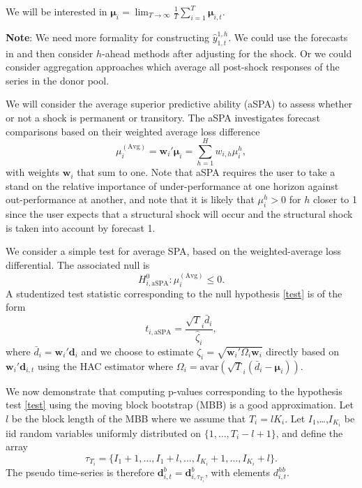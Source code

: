 \documentclass[11pt]{article}
\def\mbf#1{\mathbf{#1}} %
\theoremstyle{definition}
\begin{document}
We will be interested in $\mathbf{\mu}_i = \lim_{T\to\infty}\frac{1}{T}\sum_{i=1}^T \mathbf{\mu}_{i,t}$.

\vspace*{0.5cm}\noindent\textbf{Note}: We need more formality for constructing $\hat y^{1,h}_{1,t}$. We could use the forecasts in \cite{lin2021minimizing} and then consider $h$-ahead methods after adjusting for the shock. Or we could consider aggregation approaches which average all post-shock responses of the series in the donor pool. 
\vspace*{0.5cm}

We will consider the average superior predictive ability (aSPA) to assess whether or not a shock is permanent or transitory. The aSPA investigates forecast comparisons based on their weighted average loss difference
$$
  \mu^{(\text{Avg})}_i = \textbf{w}_i'\mathbf{\mu}_i = \sum_{h=1}^H w_{i,h} \mu_i^h,
$$
with weights $\textbf{w}_i$ that sum to one. Note that aSPA requires the user to take a stand on the relative importance of under-performance at one horizon against out-performance at another, and note that it is likely that $\mu_i^h > 0$ for $h$ closer to 1 since the user expects that a structural shock will occur and the structural shock is taken into account by forecast 1. 

We consider a simple test for average SPA, based on the weighted-average loss differential. The associated null is
\begin{equation} \label{test}
	H_{i,\text{aSPA}}^0: \mu^{(\text{Avg})}_i \leq 0.
\end{equation}
A studentized test statistic corresponding to the null hypothesis \eqref{test} is of the form 
\begin{equation} \label{tstat}
	t_{i,\text{aSPA}} = \frac{\sqrt{T}_i\bar{d}_{i}}{\hat{\zeta}_{i}},
\end{equation}
where $\bar{d}_{i} = \textbf{w}_i'\textbf{d}_{i}$ and we choose to estimate $\zeta_{i} = \sqrt{\textbf{w}_i'\Omega_{i}\textbf{w}_i}$ directly based on $\textbf{w}_i'\textbf{d}_{i,t}$ using the HAC estimator \citep{giacomini2006tests} where $\Omega_{i} = \text{avar}\left(\sqrt{T}_i(\bar{d}_{i} - \mbf{\mu}_{i})\right)$.


We now demonstrate that computing p-values corresponding to the hypothesis test \eqref{test} using the moving block bootstrap (MBB) is a good approximation. Let $l$ be the block length of the MBB where we assume that $T_i = lK_i$. Let $I_1$,\ldots,$I_{K_i}$ be iid random variables uniformly distributed on $\{1,\ldots,T_i-l+1\}$, and define the array 
$$
  \tau_{T_i} = \{I_1+1, \ldots, I_1+l, \ldots, I_{K_i}+1, \ldots, I_{K_i}+l\}.
$$
The pseudo time-series is therefore $\textbf{d}^b_{i,t} = \textbf{d}^b_{i,\tau_{T_i}}$, with elements $d^{hb}_{i,t}$.
\end{document}
